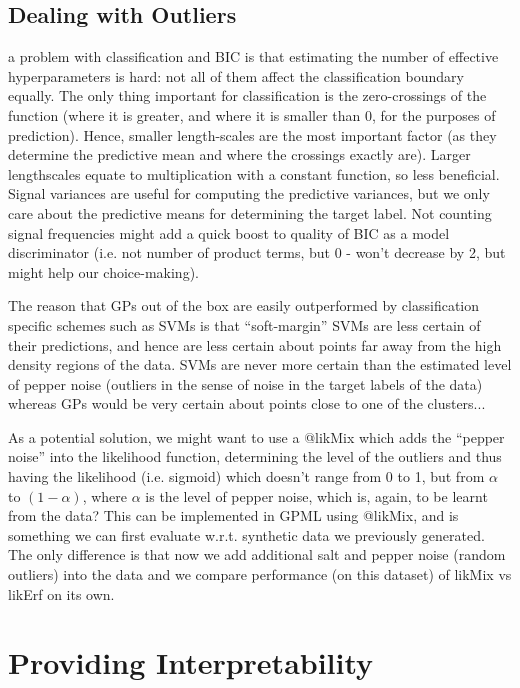 \documentclass[a4paper,12pt ]{report}
\begin{document}
\subsection{Dealing with Outliers}

a problem with classification and BIC is that estimating the number of effective hyperparameters is hard: not all of them affect the classification boundary equally. The only thing important for classification is the zero-crossings of the function (where it is greater, and where it is smaller than 0, for the purposes of prediction). Hence, smaller length-scales are the most important factor (as they determine the predictive mean and where the crossings exactly are). Larger lengthscales equate to multiplication with a constant function, so less beneficial. Signal variances are useful for computing the predictive variances, but we only care about the predictive means for determining the target label. Not counting signal frequencies might add a quick boost to quality of BIC as a model discriminator (i.e. not number of product terms, but 0 - won’t decrease by 2, but might help our choice-making). 

The reason that GPs out of the box are easily outperformed by classification specific schemes such as SVMs is that “soft-margin” SVMs are less certain of their predictions, and hence are less certain about points far away from the high density regions of the data. SVMs are never more certain than the estimated level of pepper noise (outliers in the sense of noise in the target labels of the data) whereas GPs would be very certain about points close to one of the clusters...

As a potential solution, we might want to use a @likMix which adds the “pepper noise” into the likelihood function, determining the level of the outliers and thus having the likelihood (i.e. sigmoid) which doesn’t range from 0 to 1, but from $\alpha$ to $(1 - \alpha)$, where $\alpha$ is the level of pepper noise, which is, again, to be learnt from the data? This can be implemented in GPML using @likMix, and is something we can first evaluate w.r.t. synthetic data we previously generated. The only difference is that now we add additional salt and pepper noise (random outliers) into the data and we compare performance (on this dataset) of likMix vs likErf on its own.


\section{Providing Interpretability}
\end{document}
